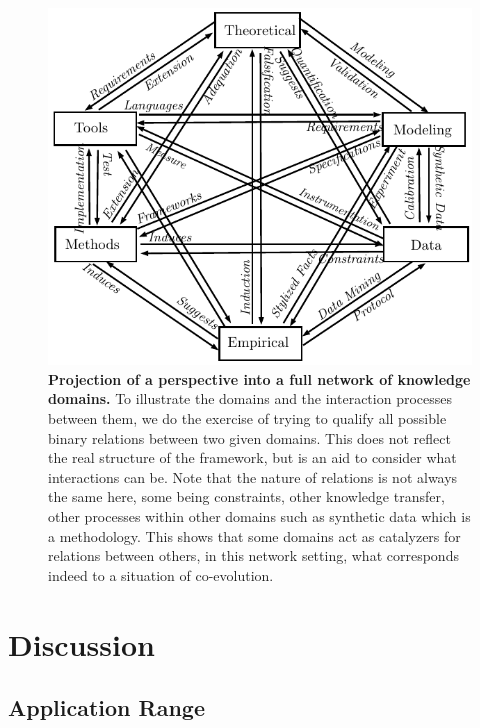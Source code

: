 \documentclass[runningheads,a4paper]{llncs2e/llncs}
\begin{document}
\begin{figure}[h!]
\centering
\includegraphics[width=\textwidth]{figures/framework}
\caption{\textbf{Projection of a perspective into a full network of knowledge domains.} To illustrate the domains and the interaction processes between them, we do the exercise of trying to qualify all possible binary relations between two given domains. This does not reflect the real structure of the framework, but is an aid to consider what interactions can be. Note that the nature of relations is not always the same here, some being constraints, other knowledge transfer, other processes within other domains such as synthetic data which is a methodology. This shows that some domains act as catalyzers for relations between others, in this network setting, what corresponds indeed to a situation of co-evolution.
}
\label{fig:fwk}
\end{figure}




\section{Discussion}



\subsection{Application Range}
\end{document}
